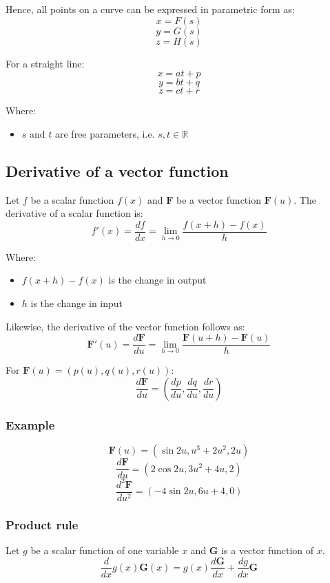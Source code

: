 \documentclass[11pt]{article}
\begin{document}
Hence, all points on a curve can be expressed in parametric form as:
\[x = F(s)\]
\[y = G(s)\]
\[z = H(s)\]

For a straight line:
\[x = at + p\]
\[y = bt + q\]
\[z = ct + r\]

Where:
\begin{itemize}
\item \(s\) and \(t\) are free parameters, i.e. \(s, t \in \mathbb{R}\)
\end{itemize}

\subsection{Derivative of a vector function}
\label{sec:orga7e3833}
Let \(f\) be a scalar function \(f(x)\) and \(\boldsymbol{F}\) be a vector function \(\boldsymbol{F}(u)\). The derivative of a scalar function is:
\[f'(x) = \frac{df}{dx} = \lim_{h \rightarrow 0} \frac{f(x + h) - f(x)}{h}\]

Where:
\begin{itemize}
\item \(f(x + h) - f(x)\) is the change in output
\item \(h\) is the change in input
\end{itemize}

Likewise, the derivative of the vector function follows as:
\[\boldsymbol{F}'(u) = \frac{d \boldsymbol{F}}{du} = \lim_{h \rightarrow 0} \frac{\boldsymbol{F}(u + h) - \boldsymbol{F}(u)}{h}\]

For \(\boldsymbol{F}(u) = (p(u), q(u), r(u))\):
\[\frac{d \boldsymbol{F}}{du} = \left(\frac{dp}{du}, \frac{dq}{du}, \frac{dr}{du} \right)\]

\subsubsection{Example}
\label{sec:orgdedb34a}
\[\boldsymbol{F}(u) = (\sin 2u, u^3 + 2u^2, 2u)\]
\[\frac{d \boldsymbol{F}}{du} = (2 \cos 2u, 3u^2 + 4u, 2)\]
\[\frac{d^2 \boldsymbol{F}}{du^2} = (-4 \sin 2u, 6u + 4, 0)\]

\subsubsection{Product rule}
\label{sec:org736d7bf}
Let \(g\) be a scalar function of one variable \(x\) and \(\boldsymbol{G}\) is a vector function of \(x\).
\[\frac{d}{dx} g(x) \boldsymbol{G}(x) = g(x) \frac{d \boldsymbol{G}}{dx} + \frac{dg}{dx} \boldsymbol{G}\]
\end{document}
